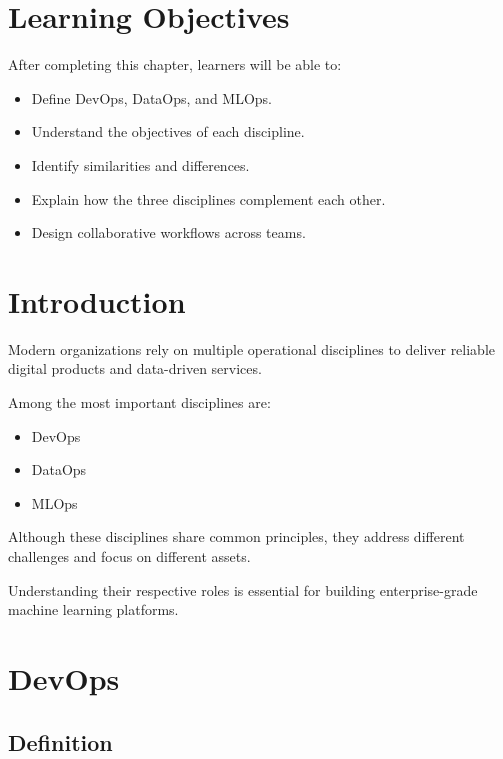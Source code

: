 
\label{chap:mlops-devops-dataops}

\section{Learning Objectives}

After completing this chapter, learners will be able to:

\begin{itemize}
    \item Define DevOps, DataOps, and MLOps.
    \item Understand the objectives of each discipline.
    \item Identify similarities and differences.
    \item Explain how the three disciplines complement each other.
    \item Design collaborative workflows across teams.
\end{itemize}

\section{Introduction}

Modern organizations rely on multiple operational disciplines to deliver reliable digital products and data-driven services.

Among the most important disciplines are:

\begin{itemize}
    \item DevOps
    \item DataOps
    \item MLOps
\end{itemize}

Although these disciplines share common principles, they address different challenges and focus on different assets.

Understanding their respective roles is essential for building enterprise-grade machine learning platforms.

\section{DevOps}

\subsection{Definition}

